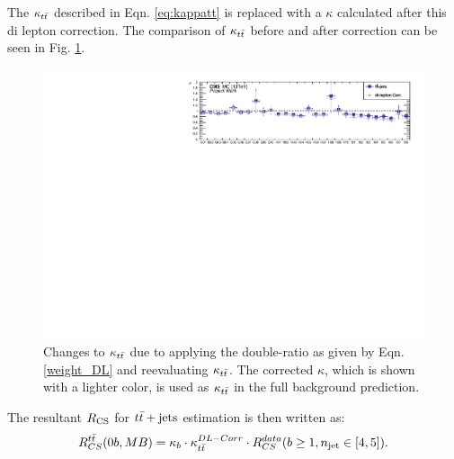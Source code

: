 The $\kappa_{t\bar{t}}$ described in Eqn. \ref{eq:kappatt} is replaced with a $\kappa$ calculated after this di lepton correction.
The comparison of $\kappa_{t\bar{t}}$ before and after correction can be seen in Fig. \ref{fig:kappa_tt}.\\
\begin{figure}[!hbt]
    \begin{center}
 \includegraphics[width=1. \textwidth]{Plots/analysis/RCS/diLepCR/Spring16_templates_SR_Moriond2017_Summer16_lep_data_Kappa_compForthesis}
  \caption{ \label{fig:kappa_tt}  Changes to $\kappa_{t\bar{t}}$ due to applying the double-ratio as given by Eqn. \ref{weight_DL} and reevaluating $\kappa_{t\bar{t}}$. The corrected $\kappa$, which is shown with a lighter color, is used as $\kappa_{t\bar{t}}$ in the full background prediction.}
  \end{center}
\end{figure}
The resultant $R_{\rm CS}$ for $t\bar{t}+\textrm{jets}$ estimation is then written as:
\begin{equation}
\label{Final_RCS}
R^{t\bar{t}}_{CS}(0b,MB) = {\kappa_b}\cdot{\kappa_{\ensuremath{t\bar{t}}}^{DL-Corr}}\cdot{R_{CS}^{data}(b \geq 1, \ensuremath{n_{\rm jet}}\in [4,5] )}.
\end{equation}
